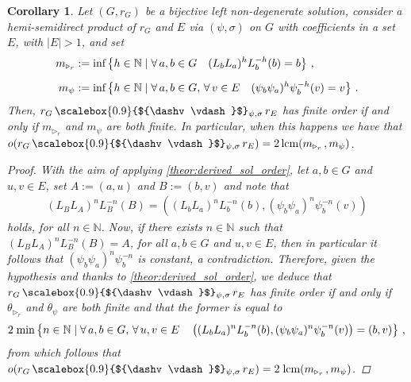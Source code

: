 \documentclass[preprint,1p]{elsarticle}
\numberwithin{equation}{section}
\newtheorem{cor}[theor]{Corollary}
\theoremstyle{definition}               %
\newcommand{\vd}{\vdash}
\newcommand{\dv}{\dashv}
\newcommand{\tr}{\triangleright}
\begin{document}
\begin{cor}\label{corol:hemi_product_sol_order}
    Let $(G,r_G)$ be a bijective left non-degenerate solution,
    consider a hemi-semidirect product of $r_G$ and $E$ via $(\psi,\sigma)$ on $G$ with coefficients in a set $E$, with $|E| > 1$, and set 
    \begin{align*}
        m_{\tr_r} 
        &:= \textnormal{inf}\left\{h \in \mathbb{N}\mid \forall\, a,b \in G \quad (L_bL_a)^hL_b^{-h}(b) = b\right\}\,,\\[0.2cm]
        m_\psi 
        &:= \textnormal{inf}\left\{h \in \mathbb{N}\mid \forall\, a,b \in G,\, \forall\, v \in E \quad (\psi_b\psi_a)^h\psi_b^{-h}(v) = v\right\} \,.
    \end{align*}
    Then, $r_G \, \text{\scalebox{0.9}{${\dv\vd}$}$_{\psi,\sigma}$}\, r_E$ has finite order if and only if $m_{\tr_r}$ and $m_\psi$ are both finite.
    In particular, when this happens we have that $o(r_G \, \text{\scalebox{0.9}{${\dv\vd}$}$_{\psi,\sigma}$}\, r_E) = 2\,\textnormal{lcm}(m_{\tr_r}\,,m_\psi)$.
    \begin{proof}
        With the aim of applying \cref{theor:derived_sol_order}, let $a,b \in G$ and $u,v \in E$, set $A:= (a,u)$ and $B:= (b,v)$ and note that
        \begin{align*}
            (L_BL_A)^nL_B^{-n}(B) = 
            \left( (L_bL_a)^nL_b^{-n}(b), (\psi_b\psi_a)^n\psi_b^{-n}(v) \right)
        \end{align*}
        holds, for all $n\in \mathbb{N}$. 
        Now, if there exists $n\in \mathbb{N}$ such that $(L_BL_A)^nL_B^{-n}(B) = A$, for all $a,b \in G$ and $u,v \in E$, then in particular it follows that $(\psi_b\psi_a)^n\psi_b^{-n}$ is constant, a contradiction.
        Therefore, given the hypothesis and thanks to \cref{theor:derived_sol_order}, we deduce that $r_G \, \text{\scalebox{0.9}{${\dv\vd}$}$_{\psi,\sigma}$}\, r_E$ has finite order if and only if $\theta_{\tr_r}$ and $\theta_\psi$ are both finite and that the former is equal to
        \begin{align*}
            2\; \textnormal{min}\left\{n\in\mathbb{N}\mid\forall\,a,b \in G,\, \forall\,u,v \in E\quad \left( (L_bL_a)^nL_b^{-n}(b), (\psi_b\psi_a)^n\psi_b^{-n}(v) \right) = (b,v) \right\}\,,
        \end{align*}
        from which follows that $o(r_G \, \text{\scalebox{0.9}{${\dv\vd}$}$_{\psi,\sigma}$}\, r_E) = 2\;\textnormal{lcm}(m_{\tr_r}\,,m_\psi)$.
    \end{proof}
\end{cor}
\end{document}
